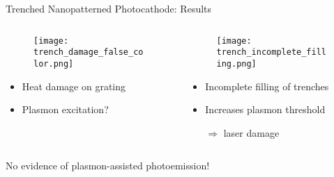 \begin{frame}{Trenched Nanopatterned Photocathode: Results}
  \begin{columns}
    \begin{column}{0.49\linewidth}
      \begin{figure}
        \centering
        \texttt{[image: trench\_damage\_false\_color.png]}
      \end{figure}
      \begin{itemize}
        \item Heat damage on grating
        \item Plasmon excitation?
      \end{itemize}
    \end{column}
    \begin{column}{0.49\linewidth}
      \begin{figure}
        \centering
        \texttt{[image: trench\_incomplete\_filling.png]}
      \end{figure}
      \begin{itemize}
        \item Incomplete filling of trenches
        \item Increases plasmon threshold 
        \item[$\Rightarrow$] laser damage 
      \end{itemize}
    \end{column}
  \end{columns}
  \vfill
  \begin{center}
    \alert{No evidence of plasmon-assisted photoemission!}
  \end{center}
\end{frame}

\begin{frame}
  \begin{figure}
    \centering
    
  \end{figure}
\end{frame}

